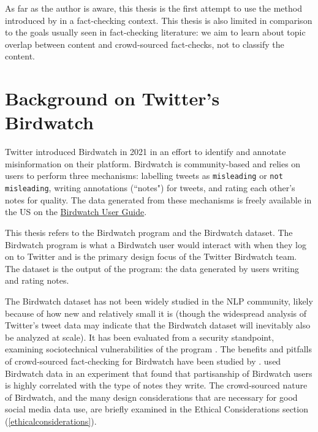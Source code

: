 \documentclass [11pt, proquest] {uwthesis}[2020/02/24]
\begin{document}
 As far as the author is aware, this thesis is the first attempt to use the method introduced by \cite{sia-etal-2020-tired} in a fact-checking context. This thesis is also limited in comparison to the goals usually seen in fact-checking literature: we aim to learn about topic overlap between content and crowd-sourced fact-checks, not to classify the content.

 \section{Background on Twitter's Birdwatch}

Twitter introduced Birdwatch in 2021 \citep{coleman_2021} in an effort to identify and annotate misinformation on their platform. Birdwatch is community-based and relies on users to perform three mechanisms: labelling tweets as \verb|misleading| or \verb|not misleading|, writing annotations (``notes") for tweets, and rating each other's notes for quality. The data generated from these mechanisms is freely available in the US on the \href{https://twitter.github.io/birdwatch/}{Birdwatch User Guide}.

This thesis refers to the Birdwatch program and
the Birdwatch dataset. The Birdwatch program is
what a Birdwatch user would interact with when
they log on to Twitter and is the primary design
focus of the Twitter Birdwatch team. The dataset is
the output of the program: the data generated by
users writing and rating notes.

The Birdwatch dataset has not been widely studied in the NLP community, likely because of how new and relatively small it is (though the widespread analysis of Twitter's tweet data \citep{antonakaki2021survey} may indicate that the Birdwatch dataset will inevitably also be analyzed at scale). It has been evaluated from a security standpoint, examining sociotechnical vulnerabilities of the program \citep{benjamin2021watches}. The benefits and pitfalls of crowd-sourced fact-checking for Birdwatch have been studied by \cite{yasseri2021can}. \cite{allen2021birds} used Birdwatch data in an experiment that found that partisanship of Birdwatch users is highly correlated with the type of notes they write. The crowd-sourced nature of Birdwatch, and the many design considerations that are necessary for good social media data use, are briefly examined in the Ethical Considerations section (\ref{ethicalconsiderations}).
\end{document}

